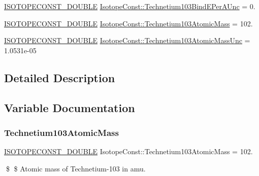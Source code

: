 \begin{DoxyCompactItemize}
\mbox{\hyperlink{group___isotope_const-_macros_ga8f45a7272ce02c0b4c65c44636ed719a}{I\+S\+O\+T\+O\+P\+E\+C\+O\+N\+S\+T\+\_\+\+D\+O\+U\+B\+LE}} \mbox{\hyperlink{group___isotope_const-_technetium-_tc103_gaa0a4edd161e7727dfa67341225f9a8de}{Isotope\+Const\+::\+Technetium103\+Bind\+E\+Per\+A\+Unc}} = 0.
\item 
\mbox{\hyperlink{group___isotope_const-_macros_ga8f45a7272ce02c0b4c65c44636ed719a}{I\+S\+O\+T\+O\+P\+E\+C\+O\+N\+S\+T\+\_\+\+D\+O\+U\+B\+LE}} \mbox{\hyperlink{group___isotope_const-_technetium-_tc103_gab320f11b0dea94c5bbfe9e66024a26fb}{Isotope\+Const\+::\+Technetium103\+Atomic\+Mass}} = 102.
\item 
\mbox{\hyperlink{group___isotope_const-_macros_ga8f45a7272ce02c0b4c65c44636ed719a}{I\+S\+O\+T\+O\+P\+E\+C\+O\+N\+S\+T\+\_\+\+D\+O\+U\+B\+LE}} \mbox{\hyperlink{group___isotope_const-_technetium-_tc103_gaf772c12896f3e40133e05bd033ed190e}{Isotope\+Const\+::\+Technetium103\+Atomic\+Mass\+Unc}} = 1.\+0531e-\/05
\end{DoxyCompactItemize}


\subsection{Detailed Description}


\subsection{Variable Documentation}
\mbox{\label{group___isotope_const-_technetium-_tc103_gab320f11b0dea94c5bbfe9e66024a26fb}} 
\subsubsection{\texorpdfstring{Technetium103\+Atomic\+Mass}{Technetium103AtomicMass}}
{\footnotesize\ttfamily \mbox{\hyperlink{group___isotope_const-_macros_ga8f45a7272ce02c0b4c65c44636ed719a}{I\+S\+O\+T\+O\+P\+E\+C\+O\+N\+S\+T\+\_\+\+D\+O\+U\+B\+LE}} Isotope\+Const\+::\+Technetium103\+Atomic\+Mass = 102.}

\$ \$ Atomic mass of Technetium-\/103 in amu. \mbox{\label{group___isotope_const-_technetium-_tc103_gaf772c12896f3e40133e05bd033ed190e}} 
